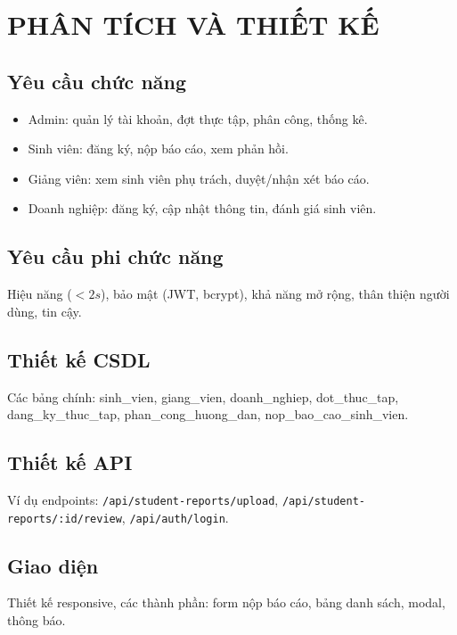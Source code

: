 \chapter{PHÂN TÍCH VÀ THIẾT KẾ}

\section{Yêu cầu chức năng}
\begin{itemize}
  \item Admin: quản lý tài khoản, đợt thực tập, phân công, thống kê.
  \item Sinh viên: đăng ký, nộp báo cáo, xem phản hồi.
  \item Giảng viên: xem sinh viên phụ trách, duyệt/nhận xét báo cáo.
  \item Doanh nghiệp: đăng ký, cập nhật thông tin, đánh giá sinh viên.
\end{itemize}

\section{Yêu cầu phi chức năng}
Hiệu năng (\(<2s\)), bảo mật (JWT, bcrypt), khả năng mở rộng, thân thiện người dùng, tin cậy.

\section{Thiết kế CSDL}
Các bảng chính: sinh\_vien, giang\_vien, doanh\_nghiep, dot\_thuc\_tap, dang\_ky\_thuc\_tap, phan\_cong\_huong\_dan, nop\_bao\_cao\_sinh\_vien.

\section{Thiết kế API}
Ví dụ endpoints: \texttt{/api/student-reports/upload}, \texttt{/api/student-reports/:id/review}, \texttt{/api/auth/login}.

\section{Giao diện}
Thiết kế responsive, các thành phần: form nộp báo cáo, bảng danh sách, modal, thông báo.
